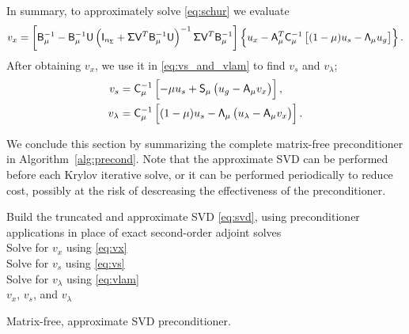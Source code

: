 In summary, to approximately solve \eqref{eq:schur} we evaluate
\begin{equation}\label{eq:vx}
  v_x = \left[\mathsf{B}_\mu^{-1} - \mathsf{B}_\mu^{-1} \mathsf{U}  \left(  \mathsf{I}_{n_{\mathsf{\Sigma}}} +  \mathsf{\Sigma} \mathsf{V}^{T} 
  \mathsf{B}_\mu^{-1} \mathsf{U} \right)^{-1} \mathsf{\Sigma} \mathsf{V}^{T} \mathsf{B}_\mu^{-1} \right]
  \left\{ u_x - \mathsf{A}_\mu^T \mathsf{C}_{\mu}^{-1} \left[(1-\mu) u_s -
  \mathsf{\Lambda}_\mu u_g \right]\right\}.
\end{equation}
After obtaining $v_x$, we use it in \eqref{eq:vs_and_vlam} to
find $v_s$ and $v_\lambda$;
\begin{align}
  v_s &= \mathsf{C}_\mu^{-1}\left[-\mu u_s + \mathsf{S}_\mu \left( u_g - \mathsf{A}_\mu v_x\right) \right], \label{eq:vs} \\
  v_\lambda &= \mathsf{C}_\mu^{-1}\left[(1-\mu)u_s - \mathsf{\Lambda}_\mu \left( u_\lambda - \mathsf{A}_\mu v_x \right) \right]. 
  \label{eq:vlam}
\end{align}


We conclude this section by summarizing the complete matrix-free preconditioner
in Algorithm~\ref{alg:precond}.  Note that the approximate SVD can be performed
before each Krylov iterative solve, or it can be performed periodically to
reduce cost, possibly at the risk of descreasing the effectiveness of the
preconditioner.

\LinesNumberedHidden
\begin{algorithm}[tbp]
\SetEndCharOfAlgoLine{}

\BlankLine
Build the truncated and approximate SVD \eqref{eq:svd}, using 
preconditioner applications in place of exact second-order adjoint solves \\
Solve for $v_x$ using \eqref{eq:vx}\\
Solve for $v_s$ using \eqref{eq:vs}\\
Solve for $v_\lambda$ using \eqref{eq:vlam}\\
\Return $v_x$, $v_s$, and $v_\lambda$
\caption{Matrix-free, approximate SVD preconditioner. \label{alg:precond}}
\end{algorithm}

